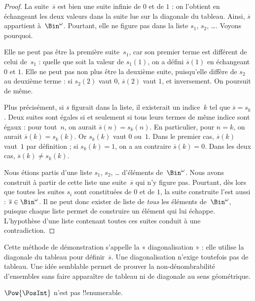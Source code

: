 \documentclass[../../../include/open-logic-section]{subfiles}
\begin{document}
\begin{proof}
La suite~$\overline{s}$ est bien une suite infinie de $0$ et de $1$ :
on l’obtient en échangeant les deux valeurs dans la suite lue
sur la diagonale du tableau. Ainsi, $\overline{s}$ appartient
à~$\Bin^\omega$. Pourtant, elle ne figure pas dans la liste
$s_1$, $s_2$, \dots. Voyons pourquoi.

Elle ne peut pas être la première suite~$s_1$, car son premier
terme est différent de celui de~$s_1$ : quelle que soit la valeur
de $s_1(1)$, on a défini $\overline{s}(1)$ en échangeant $0$ et $1$.
Elle ne peut pas non plus être la deuxième suite, puisqu’elle
diffère de $s_2$ au deuxième terme : si $s_2(2)$ vaut $0$,
$\overline{s}(2)$ vaut $1$, et inversement. On poursuit de même.

Plus précisément, si $\overline{s}$ figurait dans la liste,
il existerait un indice~$k$ tel que $\overline{s} = s_{k}$.
Deux suites sont égales si et seulement si tous leurs termes
de même indice sont égaux : pour tout~$n$, on aurait
$\overline{s}(n) = s_{k}(n)$. En particulier, pour $n = k$,
on aurait $\overline{s}(k) = s_{k}(k)$. Or $s_k(k)$ vaut $0$ ou~$1$.
Dans le premier cas, $\overline{s}(k)$ vaut~$1$ par définition ;
si $s_k(k) = 1$, on a au contraire $\overline{s}(k) = 0$.
Dans les deux cas,
$\overline{s}(k) \neq s_{k}(k)$.

Nous étions partis d’une liste $s_1$, $s_2$, \dots{} d’éléments
de~$\Bin^\omega$. Nous avons construit à partir de cette liste
une suite~$\overline{s}$ qui n’y figure pas. Pourtant, dès lors
que toutes les suites $s_i$ sont constituées de $0$ et de $1$,
la suite construite l’est aussi : $\overline{s} \in \Bin^\omega$.
Il ne peut donc exister de liste de \emph{tous} les éléments
de~$\Bin^\omega$, puisque chaque liste permet de construire
un élément qui lui échappe. L’hypothèse d’une liste contenant
toutes ces suites conduit à une contradiction.
\end{proof}

\begin{explain}
Cette méthode de démonstration s’appelle la « diagonalisation » :
elle utilise la diagonale du tableau pour définir~$\overline{s}$.
Une diagonalisation n’exige toutefois pas de tableau. Une idée
semblable permet de prouver la non-dénombrabilité d’ensembles
sans faire apparaître de tableau ni de diagonale au sens géométrique.
\end{explain}

\begin{thm}
$\Pow{\PosInt}$ n’est pas !!{enumerable}.
\end{thm}
\end{document}
